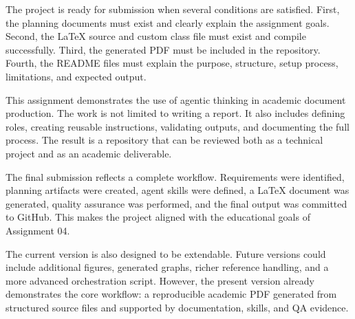 \documentclass{custom-academic-template}
\begin{document}
The project is ready for submission when several conditions are satisfied. First, the planning documents must exist and clearly explain the assignment goals. Second, the LaTeX source and custom class file must exist and compile successfully. Third, the generated PDF must be included in the repository. Fourth, the README files must explain the purpose, structure, setup process, limitations, and expected output.

This assignment demonstrates the use of agentic thinking in academic document production. The work is not limited to writing a report. It also includes defining roles, creating reusable instructions, validating outputs, and documenting the full process. The result is a repository that can be reviewed both as a technical project and as an academic deliverable.

The final submission reflects a complete workflow. Requirements were identified, planning artifacts were created, agent skills were defined, a LaTeX document was generated, quality assurance was performed, and the final output was committed to GitHub. This makes the project aligned with the educational goals of Assignment 04.

The current version is also designed to be extendable. Future versions could include additional figures, generated graphs, richer reference handling, and a more advanced orchestration script. However, the present version already demonstrates the core workflow: a reproducible academic PDF generated from structured source files and supported by documentation, skills, and QA evidence.
\end{document}

